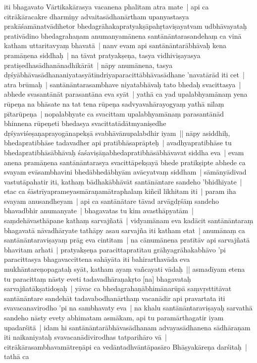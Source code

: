 \documentclass[article,12pt,a4paper]{memoir}%
\newcounter{parCount}
\begin{document}
	  
	  \pstart \leavevmode%
	iti bhagavato Vārtikakārasya vacanena phalitam atra mate | api ca citrākāracakre dharmiṇy advaitasādhanārtham upanyastasya prakāśamānatvādihetor bhedagrāhakapratyakṣāpahṛtaviṣayatvam udbhāvayataḥ prativādino bhedagrahaṇam anumanyamānena santānāntarasandehaṃ ca vinā katham uttaritavyaṃ bhavatā | \label{thakur75-148.21} nanv evam api santānāntarābhāvaḥ kena pramāṇena siddhaḥ | na tāvat pratyakṣeṇa, tasya vidhiviṣayasya pratiṣedhasādhanānadhikārāt | nāpy anumānena, tasya dṛśyābhāvasādhananiyatasyātīndriyaparacittābhāvasādhane 'navatārād iti cet | atra brūmaḥ | santānāntarasambhave niyatabhāvaḥ tato bhedaḥ svacittasya | abhede svasantānāt parasantāna eva syāt | yathā ca yad upalabhyamānaṃ yena rūpeṇa na bhāsate na tat tena rūpeṇa sadvyavahārayogyaṃ yathā nīlaṃ pītarūpeṇa | nopalabhyate ca svacittam upalabhyamānaṃ parasantānād bhinnena rūpeṇeti bhedasya svacittatādātmyaniṣedhe dṛśyaviśeṣaṇaprayogānapekṣā svabhāvānupalabdhir iyam || \label{thakur75-148.28} nāpy asiddhiḥ, bhedapratibhāse tadavadher api pratibhāsaprāpteḥ | avadhyapratibhāse tu bhedapratibhāsābhāvaḥ śaśaviṣāṇabhedapratibhāsābhāvavat siddha eva | evam anena pramāṇena santānāntarasya svacittāpekṣayā bhede pratikṣipte abhede ca svayam evāsambhavini bhedābhedābhyām avācyatvaṃ siddham | sāmānyādivad vastutāpahatir iti, kathaṃ bādhakābhāvāt santānāntare sandeho 'bhidhīyate | etac ca śāstrīyaprameyasmāraṇamātraphalaṃ kiñcil likhitam iti | param iha svayam anusandheyam | \label{thakur75-149.3} api ca santānātare tāvad arvāgdṛśāṃ sandeho bhavadbhir anumanyate | bhagavatas tu kim avasthāpyatām | saṃdehāvasthāpane kathaṃ sarvajñatā | vidyamānam eva kadācit santānāntaraṃ bhagavatā nāvadhāryate tathāpy asau sarvajña iti katham etat | anumānaṃ ca santānāntaraviṣayaṃ prāg eva cintitam | na cānumānena pratītāv api sarvajñatā bhavitam arhati | pratyakṣeṇa paracittapratītau grāhyagrāhakabhāvo 'pi paracittasya bhagavaccittena sahāyāta iti bahirarthavāda eva mukhāntareṇopagataḥ syāt, katham ayaṃ vañcayati vādaḥ || \label{thakur75-149.9} asmadīyam etena tu paracittaṃ nāsty eveti tadavadhāraṇakṛto [na] bhagavataḥ sarvajñatākṣatidoṣaḥ | yāvac ca bhedagrahaṇābhimānarūpā saṃvṛsttitāvat santānāntare sandehāt tadavabodhanārthaṃ vacanādir api pravartata iti svavacanavirodho 'pi na sambhavaty eva | na khalu santānāntaraviṣayaḥ sarvathā sandeho nāsty evety abhimatam asmākam, api tu paramārthagatir iyam upadarśitā | idam hi santānāntarābhāvasādhanam advayasādhanena sādhāraṇam iti naikaniyataḥ svavacanādivirodhas tatparihāro vā | citrākārasambhavamātreṇāpi ca vedāntadhvāntāpasāro Bhāṣyakāreṇa darśitaḥ | tathā ca
	{}
	\pend%
      
\end{document}
